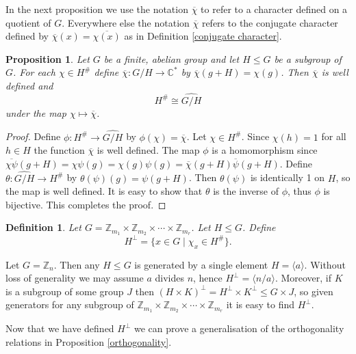 \documentclass[12pt]{article}
\newtheorem{Definition}{Definition}
\newtheorem{Proposition}{Proposition}
\newcommand{\Z}{\mathbb{Z}}
\newcommand{\C}{\mathbb{C}}
\newcommand{\Zm}{\Z_{m_1}\times \Z_{m_2} \times \cdots \times \Z_{m_r}}
\begin{document}
In the next proposition we use the notation $\overline{\chi}$ to refer to a character defined on a quotient of $G$. Everywhere else the notation $\overline{\chi}$ refers to the conjugate character defined by $\overline{\chi}(x) = \overline{\chi(x)}$ as in Definition \ref{conjugate character}.

\begin{Proposition} \label{dual} %
    Let $G$ be a finite, abelian group and let $H\leq G$ be a subgroup of $G$. For each $\chi\in H^\#$ define $\overline{\chi}:G/H\to \C^*$ by $\overline{\chi}(g+H) = \chi(g)$. Then $\overline{\chi}$ is well defined and
    $$H^\#\cong \widehat{G/H}$$ under the map $\chi\mapsto \overline{\chi}$.
\end{Proposition}
\begin{proof}
    Define $\phi: H^\# \to \widehat{G/H}$ by $\phi(\chi) = \overline{\chi}$. Let $\chi\in H^\#$. Since $\chi(h) = 1$ for all $h\in H$ the function $\overline{\chi}$ is well defined. The map $\phi$ is a homomorphism since $\overline{\chi\psi}(g+H) = \chi\psi(g) = \chi(g)\psi(g) = \overline{\chi}(g+H)\overline{\psi}(g+H).$ Define $\theta : \widehat{G/H} \to H^\#$ by $\theta(\psi)(g) = \psi(g+H)$. Then $\theta(\psi)$ is identically 1 on $H$, so the map is well defined. It is easy to show that $\theta$ is the inverse of $\phi$, thus $\phi$ is bijective. This completes the proof.
\end{proof}

\begin{Definition} \label{Hperp}
    Let $G = \Zm$. Let $H\leq G$. Define
    \[
        H^\perp = \{x\in G\mid \chi_x\in H^\#\}.
    \]
\end{Definition}

Let $G = \Z_n$. Then any $H\leq G$ is generated by a single element $H = \langle a \rangle $. Without loss of generality we may assume $a$ divides $n$, hence $H^\perp = \langle n/a\rangle$.  Moreover, if $K$ is a subgroup of some group $J$ then $(H\times K)^\perp = H^\perp \times K^\perp\leq G\times J$, so given generators for any subgroup of $\Zm$ it is easy to find $H^\perp$.

Now that we have defined $H^\perp$ we can prove a generalisation of the orthogonality relations in Proposition \ref{orthogonality}.
\end{document}
